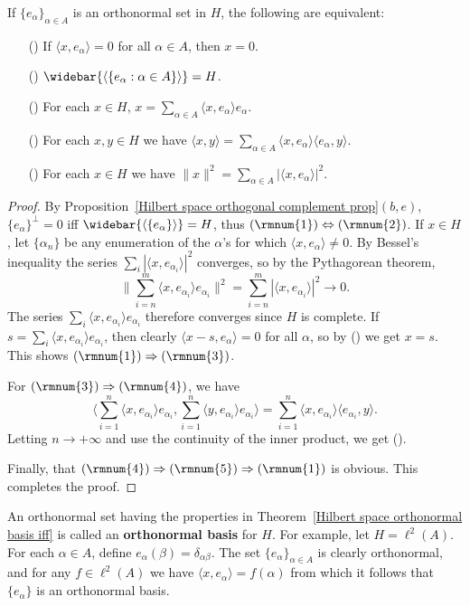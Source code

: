 \begin{theorem}\label{Hilbert space orthonormal basis iff}
If $\{e_{\alpha}\}_{\alpha\in A}$ is an orthonormal set in $H$, the following are equivalent:
\begin{itemize}
\item[(\rmnum{1})] If $\langle x,e_{\alpha}\rangle=0$ for all $\alpha\in A$, then $x=0$.
\item[(\rmnum{2})] $\widebar{\langle\{e_\alpha:\alpha\in A\}\rangle}=H$.
\item[(\rmnum{3})] For each $x\in H$, $x=\sum_{\alpha\in A}\langle x,e_{\alpha}\rangle e_{\alpha}$.
\item[(\rmnum{4})] For each $x,y\in H$ we have $\langle x,y\rangle=\sum_{\alpha\in A}\langle x,e_\alpha\rangle\langle e_\alpha,y\rangle$.
\item[(\rmnum{5})] For each $x\in H$ we have $\|x\|^2=\sum_{\alpha\in A}|\langle x,e_{\alpha}\rangle|^2$.
\end{itemize}
\end{theorem}
\begin{proof}
By Proposition~\ref{Hilbert space orthogonal complement prop}$(b,e)$, $\{e_\alpha\}^\bot=0$ iff $\widebar{\langle\{e_\alpha\}\rangle}=H$, thus $(\rmnum{1})\Leftrightarrow(\rmnum{2})$. If $x\in H$, let $\{\alpha_n\}$ be any enumeration of the $\alpha$'s for which $\langle x,e_{\alpha}\rangle\neq 0$. By Bessel's inequality the series $\sum_i|\langle x,e_{\alpha_i}\rangle|^2$ converges, so by the Pythagorean theorem,
\[\Big\|\sum_{i=n}^{m}\langle x,e_{\alpha_i}\rangle e_{\alpha_i}\Big\|^2=\sum_{i=n}^{m}|\langle x,e_{\alpha_i}\rangle|^2\to 0.\]
The series $\sum_i\langle x,e_{\alpha_i}\rangle e_{\alpha_i}$ therefore converges since $H$ is complete. If $s=\sum_i\langle x,e_{\alpha_i}\rangle e_{\alpha_i}$, then clearly $\langle x-s,e_{\alpha}\rangle=0$ for all $\alpha$, so by () we get $x=s$. This shows $(\rmnum{1})\Rightarrow(\rmnum{3})$.\par
For $(\rmnum{3})\Rightarrow(\rmnum{4})$, we have
\[\langle\sum_{i=1}^{n}\langle x,e_{\alpha_i}\rangle e_{\alpha_i},\sum_{i=1}^{n}\langle y,e_{\alpha_i}\rangle e_{\alpha_i}\rangle=\sum_{i=1}^{n}\langle x,e_{\alpha_i}\rangle\langle e_{\alpha_i},y\rangle.\]
Letting $n\to+\infty$ and use the continuity of the inner product, we get ().\par
Finally, that $(\rmnum{4})\Rightarrow(\rmnum{5})\Rightarrow(\rmnum{1})$ is obvious. This completes the proof.
\end{proof}
An orthonormal set having the properties in Theorem~\ref{Hilbert space orthonormal basis iff} is called an \textbf{orthonormal basis} for $H$. For example, let $H=\ell^2(A)$. For each $\alpha\in A$, define $e_\alpha(\beta)=\delta_{\alpha\beta}$. The set $\{e_\alpha\}_{\alpha\in A}$ is clearly orthonormal, and for any $f\in\ell^2(A)$ we have $\langle x,e_\alpha\rangle=f(\alpha)$ from which it follows that $\{e_\alpha\}$ is an orthonormal basis.
